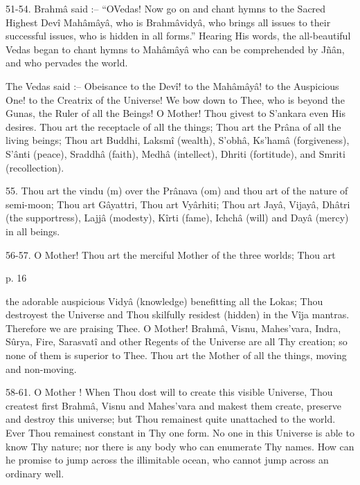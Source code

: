  

51-54. Brahmâ said :-- “OVedas! Now go on and chant hymns to the Sacred Highest Devî Mahâmâyâ, who is Brahmâvidyâ, who brings all issues to their successful issues, who is hidden in all forms.” Hearing His words, the all-beautiful Vedas began to chant hymns to Mahâmâyâ who can be comprehended by Jñân, and who pervades the world.

 

The Vedas said :-- Obeisance to the Devî! to the Mahâmâyâ! to the Auspicious One! to the Creatrix of the Universe! We bow down to Thee, who is beyond the Gunas, the Ruler of all the Beings! O Mother! Thou givest to S’ankara even His desires. Thou art the receptacle of all the things; Thou art the Prâna of all the living beings; Thou art Buddhi, Laksmî (wealth), S’obhâ, Ks'hamâ (forgiveness), S’ânti (peace), Sraddhâ (faith), Medhâ (intellect), Dhriti (fortitude), and Smriti (recollection).

 

 

55. Thou art the vindu (m) over the Prânava (om) and thou art of the nature of semi-moon; Thou art Gâyattri, Thou art Vyârhiti; Thou art Jayâ, Vijayâ, Dhâtri (the supportress), Lajjâ (modesty), Kîrti (fame), Ichchâ (will) and Dayâ (mercy) in all beings.

 

56-57. O Mother! Thou art the merciful Mother of the three worlds; Thou art

 

p. 16

 

the adorable auspicious Vidyâ (knowledge) benefitting all the Lokas; Thou destroyest the Universe and Thou skilfully residest (hidden) in the Vîja mantras. Therefore we are praising Thee. O Mother! Brahmâ, Visnu, Mahes’vara, Indra, Sûrya, Fire, Sarasvatî and other Regents of the Universe are all Thy creation; so none of them is superior to Thee. Thou art the Mother of all the things, moving and non-moving.

 

58-61. O Mother ! When Thou dost will to create this visible Universe, Thou createst first Brahmâ, Visnu and Mahes'vara and makest them create, preserve and destroy this universe; but Thou remainest quite unattached to the world. Ever Thou remainest constant in Thy one form. No one in this Universe is able to know Thy nature; nor there is any body who can enumerate Thy names. How can he promise to jump across the illimitable ocean, who cannot jump across an ordinary well.

